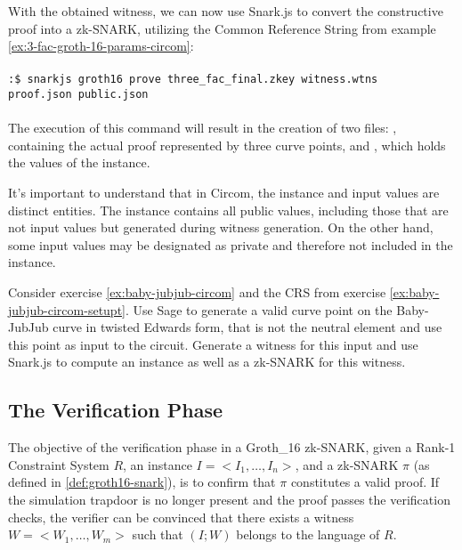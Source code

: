 \begin{example}
With the obtained witness, we can now use Snark.js to convert the constructive proof into a zk-SNARK, utilizing the Common Reference String from example \ref{ex:3-fac-groth-16-params-circom}:
\\
\\
\texttt{:\$ snarkjs groth16 prove three\_fac\_final.zkey witness.wtns \\ proof.json public.json}
\\
\\
The execution of this command will result in the creation of two files: , containing the actual proof represented by three curve points, and , which holds the values of the instance. 

It's important to understand that in Circom, the instance and input values are distinct entities. The instance contains all public values, including those that are not input values but generated during witness generation. On the other hand, some input values may be designated as private and therefore not included in the instance. 
\end{example}

\begin{exercise} 
\label{ex:baby-jubjub-circom-prover}
Consider exercise \ref{ex:baby-jubjub-circom} and the CRS from exercise \ref{ex:baby-jubjub-circom-setupt}. Use Sage to generate a valid curve point on the Baby-JubJub curve in twisted Edwards form, that is not the neutral element and use this point as input to the circuit. Generate a witness for this input and use Snark.js to compute an instance as well as a zk-SNARK for this witness. 
\end{exercise}

\subsection{The Verification Phase}
\label{sec:groth16-verifier}
The objective of the verification phase in a Groth\_16 zk-SNARK, given a Rank-1 Constraint System $R$, an instance $I = <I_1, \ldots, I_n>$, and a zk-SNARK $\pi$ (as defined in \ref{def:groth16-snark}), is to confirm that $\pi$ constitutes a valid proof. If the simulation trapdoor is no longer present and the proof passes the verification checks, the verifier can be convinced that there exists a witness $W = <W_1, \ldots, W_m>$ such that $(I;W)$ belongs to the language of $R$. 

